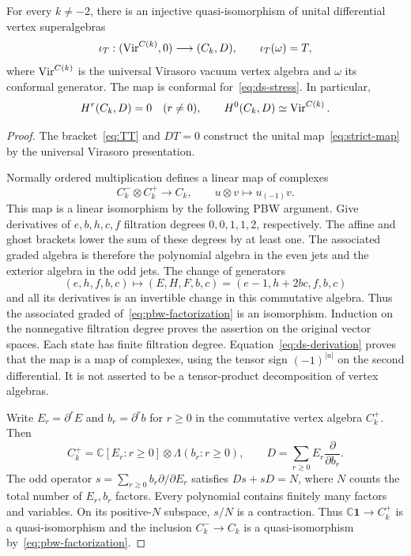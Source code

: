 \begin{theorem}\label{thm:affine-comparison}
For every $k\neq-2$, there is an injective quasi-isomorphism of unital differential vertex superalgebras
\begin{equation}\label{eq:strict-map}
 \iota_T:(\operatorname{Vir}^{C(k)},0)\longrightarrow(C_k,D),
 \qquad \iota_T(\omega)=T,
\end{equation}
where $\operatorname{Vir}^{C(k)}$ is the universal Virasoro vacuum vertex algebra and $\omega$ its conformal generator.
The map is conformal for~\eqref{eq:ds-stress}.
In particular,
\[
 H^r(C_k,D)=0\quad(r\neq0),
 \qquad H^0(C_k,D)\simeq\operatorname{Vir}^{C(k)}.
\]
\end{theorem}

\begin{proof}
The bracket~\eqref{eq:TT} and $DT=0$ construct the unital map~\eqref{eq:strict-map} by the universal Virasoro presentation.

Normally ordered multiplication defines a linear map of complexes
\begin{equation}\label{eq:pbw-factorization}
 C_k^-\otimes C_k^+\longrightarrow C_k,
 \qquad u\otimes v\longmapsto u_{(-1)}v.
\end{equation}
This map is a linear isomorphism by the following PBW argument.
Give derivatives of $e,b,h,c,f$ filtration degrees $0,0,1,1,2$, respectively.
The affine and ghost brackets lower the sum of these degrees by at least one.
The associated graded algebra is therefore the polynomial algebra in the even jets and the exterior algebra in the odd jets.
The change of generators
\[
 (e,h,f,b,c)\longmapsto(E,H,F,b,c)
       =(e-1,h+2bc,f,b,c)
\]
and all its derivatives is an invertible change in this commutative algebra.
Thus the associated graded of~\eqref{eq:pbw-factorization} is an isomorphism.
Induction on the nonnegative filtration degree proves the assertion on the original vector spaces.
Each state has finite filtration degree.
Equation~\eqref{eq:ds-derivation} proves that the map is a map of complexes, using the tensor sign $(-1)^{|u|}$ on the second differential.
It is not asserted to be a tensor-product decomposition of vertex algebras.

Write $E_r=\partial^rE$ and $b_r=\partial^rb$ for $r\geq0$ in the commutative vertex algebra $C_k^+$.
Then
\[
 C_k^+=\mathbb C[E_r:r\geq0]\otimes\Lambda(b_r:r\geq0),
 \qquad D=\sum_{r\geq0}E_r\frac{\partial}{\partial b_r}.
\]
The odd operator $s=\sum_{r\geq0}b_r\partial/\partial E_r$ satisfies
$Ds+sD=N$, where $N$ counts the total number of $E_r,b_r$ factors.
Every polynomial contains finitely many factors and variables.
On its positive-$N$ subspace, $s/N$ is a contraction.
Thus $\mathbb C\mathbf1\to C_k^+$ is a quasi-isomorphism and the inclusion $C_k^-\to C_k$ is a quasi-isomorphism by~\eqref{eq:pbw-factorization}.


\end{proof}

